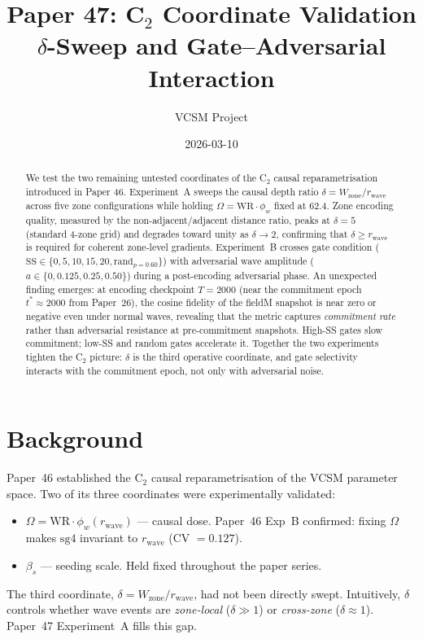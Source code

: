 \documentclass[11pt,a4paper]{article}
\title{\textbf{Paper 47: C$_2$ Coordinate Validation}\\
\large $\delta$-Sweep and Gate--Adversarial Interaction}
\author{VCSM Project}
\date{2026-03-10}
\begin{document}
\maketitle

\begin{abstract}
We test the two remaining untested coordinates of the C$_2$ causal
reparametrisation introduced in Paper 46.  Experiment~A sweeps the causal depth
ratio $\delta = W_\text{zone}/r_\text{wave}$ across five zone configurations
while holding $\Omega = \mathrm{WR}\cdot\phi_w$ fixed at 62.4.  Zone encoding
quality, measured by the non-adjacent/adjacent distance ratio, peaks at
$\delta = 5$ (standard 4-zone grid) and degrades toward unity as
$\delta \to 2$, confirming that $\delta \geq r_\text{wave}$ is required for
coherent zone-level gradients.  Experiment~B crosses gate condition
($\mathrm{SS} \in \{0,5,10,15,20,\text{rand}_{p=0.60}\}$) with adversarial
wave amplitude ($a \in \{0, 0.125, 0.25, 0.50\}$) during a post-encoding
adversarial phase.  An unexpected finding emerges: at encoding checkpoint
$T = 2000$ (near the commitment epoch $t^* \approx 2000$ from Paper~26), the
cosine fidelity of the fieldM snapshot is near zero or negative even under
normal waves, revealing that the metric captures \emph{commitment rate} rather
than adversarial resistance at pre-commitment snapshots.  High-SS gates slow
commitment; low-SS and random gates accelerate it.  Together the two experiments
tighten the C$_2$ picture: $\delta$ is the third operative coordinate, and gate
selectivity interacts with the commitment epoch, not only with adversarial noise.
\end{abstract}

\section{Background}

Paper~46 established the C$_2$ causal reparametrisation of the VCSM parameter
space.  Two of its three coordinates were experimentally validated:
\begin{itemize}
  \item $\Omega = \mathrm{WR}\cdot\phi_w(r_\text{wave})$ --- causal dose.
        Paper~46 Exp~B confirmed: fixing $\Omega$ makes $\mathrm{sg4}$ invariant
        to $r_\text{wave}$ (CV $= 0.127$).
  \item $\beta_s$ --- seeding scale.  Held fixed throughout the paper series.
\end{itemize}
The third coordinate, $\delta = W_\text{zone}/r_\text{wave}$, had not been
directly swept.  Intuitively, $\delta$ controls whether wave events are
\emph{zone-local} ($\delta \gg 1$) or \emph{cross-zone} ($\delta \approx 1$).
Paper~47 Experiment~A fills this gap.
\end{document}
